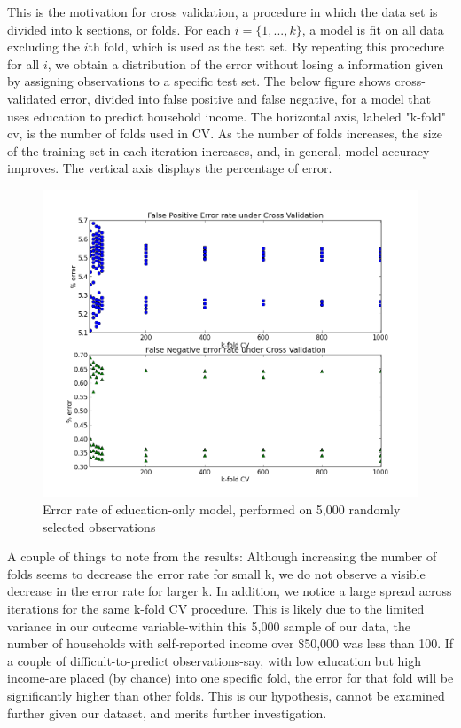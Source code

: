 \documentclass[11pt]{article}
\begin{document}
This is the motivation for cross validation, a procedure in which the data set is divided into k sections, or folds. For each $i = \{1,...,k\}$, a model is fit on all data excluding the $i$th fold, which is used as the test set. By repeating this procedure for all $i$, we obtain a distribution of the error without losing a information given by assigning observations to a specific test set. The below figure shows cross-validated error, divided into false positive and false negative, for a model that uses education to predict household income. The horizontal axis, labeled "k-fold" cv, is the number of folds used in CV. As the number of folds increases, the size of the training set in each iteration increases, and, in general, model accuracy improves. The vertical axis displays the percentage of error. 
\begin{figure}[H]
\centering
\includegraphics[width = 12cm]{CV_5K_1Kfold.png}
\caption{Error rate of education-only model, performed on 5,000 randomly selected observations}
\end{figure}

A couple of things to note from the results: Although increasing the number of folds seems to decrease the error rate for small k, we do not observe a visible decrease in the error rate for larger k. In addition, we notice a large spread across iterations for the same k-fold CV procedure. This is likely due to the limited variance in our outcome variable-within this 5,000 sample of our data, the number of households with self-reported income over \$50,000 was less than 100. If a couple of difficult-to-predict observations-say, with low education but high income-are placed (by chance) into one specific fold, the error for that fold will be significantly higher than other folds. This is our hypothesis, cannot be examined further given our dataset, and merits further investigation.
\end{document}
